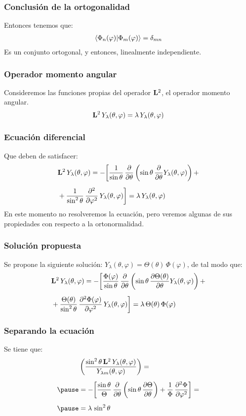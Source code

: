 \documentclass[12pt]{beamer}
\begin{document}
\begin{frame}
\frametitle{Conclusión de la ortogonalidad}
Entonces tenemos que:
\pause
\begin{align}
\braket{\Phi_{n}(\varphi)}{\Phi_{m}(\varphi)} = \delta_{mn}
\label{eq:ecuacion_06_70}    
\end{align}
Es un conjunto ortogonal, \pause y entonces, linealmente independiente.
\end{frame}

\begin{frame}
\frametitle{Operador momento angular}
Consideremos las funciones propias del operador $\vb{L}^{2}$, el operador momento angular.
\pause
\begin{align*}
\vb{L}^{2} \, Y_{\lambda} (\theta, \varphi) =  \lambda \, Y_{\lambda} (\theta, \varphi)
\end{align*}
\end{frame}
\begin{frame}
\frametitle{Ecuación diferencial}
Que deben de satisfacer:
\pause
\begin{align*}
&\vb{L}^{2} \, Y_{\lambda} (\theta, \varphi) = - \bigg[ \dfrac{1}{\sin \theta} \, \pdv{\theta} \left( \sin \theta \, \pdv{\theta} Y_{\lambda} (\theta, \varphi) \right) + \\[0.5em]
&+ \dfrac{1}{\sin^{2} \theta} \, \pdv[2]{\varphi} \, Y_{\lambda} (\theta, \varphi) \bigg] = \lambda \, Y_{\lambda} (\theta, \varphi)
\end{align*}
\pause
En este momento no resolveremos la ecuación, pero veremos algunas de sus propiedades con respecto a la ortonormalidad.
\end{frame}
\begin{frame}
\frametitle{Solución propuesta}
Se propone la siguiente solución: $Y_{\lambda} (\theta, \varphi) = \Theta(\theta) \, \Phi(\varphi)$, de tal modo que:
\pause
\begin{align*}
&\vb{L}^{2} \, Y_{\lambda} (\theta, \varphi) =  - \bigg[ \dfrac{\Phi(\varphi)}{\sin \theta} \, \pdv{\theta} \left( \sin \theta \, \pdv{\Theta(\theta)}{\theta} Y_{\lambda} (\theta, \varphi) \right) + \\[0.5em]
&+ \dfrac{\Theta(\theta)}{\sin^{2} \theta} \, \pdv[2]{\Phi(\varphi)}{\varphi} \, Y_{\lambda} (\theta, \varphi) \bigg] = \lambda \, \Theta(\theta) \, \Phi(\varphi)
\end{align*}
\end{frame}
\begin{frame}
\frametitle{Separando la ecuación}
Se tiene que:
\pause
\begin{equation}
\begin{aligned}[b]
&\left( \dfrac{\sin^{2} \theta \, \vb{L}^{2} \, Y_{\lambda} (\theta, \varphi)}{Y_{\lambda m} (\theta, \varphi)} \right) = \\[0.5em] \pause 
&= - \bigg[ \dfrac{\sin \theta}{\Theta} \, \pdv{\theta} \left( \sin \theta \, \pdv{\Theta}{\theta} \right) + \dfrac{1}{\Phi} \, \pdv[2]{\Phi}{\varphi} \bigg] = \\[0.5em] \pause
&= \lambda \, \sin^{2} \theta
\end{aligned}
\label{eq:ecuacion_06_91}
\end{equation}
\end{frame}
\end{document}
